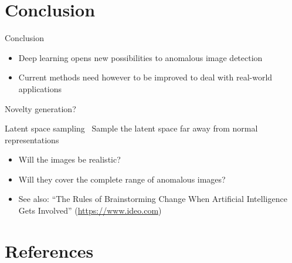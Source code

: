 \documentclass[xcolor=pdftex,dvipsnames,table,mathserif]{beamer}
\begin{document}
\section{Conclusion}

\begin{frame}{Conclusion}

\begin{itemize}
\item Deep learning opens new possibilities to anomalous image detection
\item Current methods need however to be improved to deal with real-world applications
\end{itemize}

\end{frame}


\begin{frame}{Novelty generation?}

  \begin{block}{Latent space sampling~\cite{cherti_out--class_2017}}
    Sample the latent space far away from normal representations
    \begin{itemize}
    \item Will the images be realistic?
    \item Will they cover the complete range of anomalous images?
    \end{itemize}
  \end{block}

\begin{itemize}
\item See also: ``The Rules of Brainstorming Change When Artificial Intelligence Gets Involved'' (\url{https://www.ideo.com})
\end{itemize}

\end{frame}



\section*{References}


\end{document}
